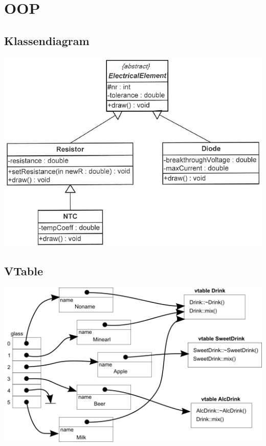 \section{OOP}

\subsection{Klassendiagram}
\includegraphics[width=\columnwidth]{Images/classdiagram}
\newpage

\subsection{VTable}

\includegraphics[width=\columnwidth]{Images/vtable}


